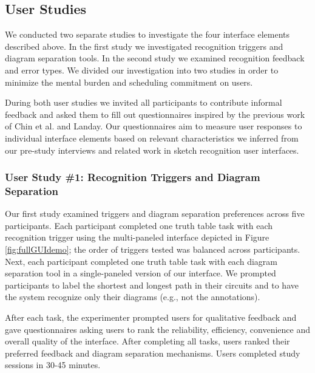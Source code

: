 \documentclass{egpubl}
\begin{document}


\subsection{User Studies}
\label{sec:design}
We conducted two separate studies to investigate the four interface
elements described above. In the first study we investigated
recognition triggers and diagram separation tools.  In the second
study we examined recognition feedback and error types. We divided our
investigation into two studies in order to minimize the mental burden and
scheduling commitment on users.

During both user studies we invited all participants to contribute
informal feedback and asked them to fill out questionnaires inspired
by the previous work of Chin et al.\cite{chin88} and
Landay\cite{landay96thesis}.  Our questionnaires aim to measure user
responses to individual interface elements based on relevant
characteristics we inferred from our pre-study interviews and related
work in sketch recognition user interfaces.

\subsubsection{User Study \#1: Recognition Triggers and Diagram
  Separation} 

Our first study examined triggers and diagram separation preferences
across five participants.  Each participant completed one truth table
task with each recognition trigger using the multi-paneled interface
depicted in Figure \ref{fig:fullGUIdemo}; the order of triggers tested
was balanced across participants.  Next, each participant completed
one truth table task with each diagram separation tool in a
single-paneled version of our interface.  We prompted participants to
label the shortest and longest path in their circuits and to have the
system recognize only their diagrams (e.g., not the annotations).

After each task, the experimenter prompted users for qualitative
feedback and gave questionnaires asking users to rank the reliability,
efficiency, convenience and overall quality of the interface.  After
completing all tasks, users ranked their preferred feedback and
diagram separation mechanisms.  Users completed study sessions in
30-45 minutes.
\end{document}
